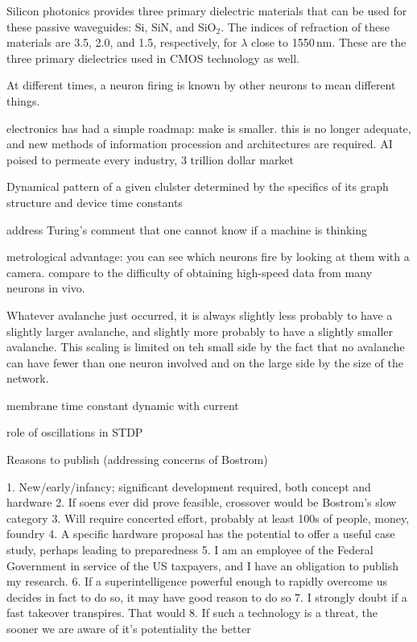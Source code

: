 \documentclass[twocolumn]{article}
\begin{document}
\vspace{2em}
Silicon photonics provides three primary dielectric materials that can be used for these passive waveguides: Si, SiN, and SiO$_2$. The indices of refraction of these materials are 3.5, 2.0, and 1.5, respectively, for $\lambda$ close to 1550\,nm. These are the three primary dielectrics used in CMOS technology as well. 

\vspace{2em}
At different times, a neuron firing is known by other neurons to mean different things.

\vspace{3em}
electronics has had a simple roadmap: make is smaller. this is no longer adequate, and new methods of information procession and architectures are required. AI poised to permeate every industry, 3 trillion dollar market

\vspace{3em}
Dynamical pattern of a given clulster determined by the specifics of its graph structure and device time constants

\vspace{3em}
address Turing's comment that one cannot know if a machine is thinking

\vspace{3em}
metrological advantage: you can see which neurons fire by looking at them with a camera. compare to the difficulty of obtaining high-speed data from many neurons in vivo.

\vspace{3em}
Whatever avalanche just occurred, it is always slightly less probably to have a slightly larger avalanche, and slightly more probably to have a slightly smaller avalanche. This scaling is limited on teh small side by the fact that no avalanche can have fewer than one neuron involved and on the large side by the size of the network.

\vspace{3em}
membrane time constant dynamic with current

\vspace{3em}
role of oscillations in STDP

\vspace{3em}
Reasons to publish (addressing concerns of Bostrom)

1. New/early/infancy; significant development required, both concept and hardware
2. If soens ever did prove feasible, crossover would be Bostrom's slow category
3. Will require concerted effort, probably at least 100s of people, money, foundry
4. A specific hardware proposal has the potential to offer a useful case study, perhaps leading to preparedness
5. I am an employee of the Federal Government in service of the US taxpayers, and I have an obligation to publish my research.
6. If a superintelligence powerful enough to rapidly overcome us decides in fact to do so, it may have good reason to do so
7. I strongly doubt if a fast takeover transpires. That would
8. If such a technology is a threat, the sooner we are aware of it's potentiality the better
\end{document}
